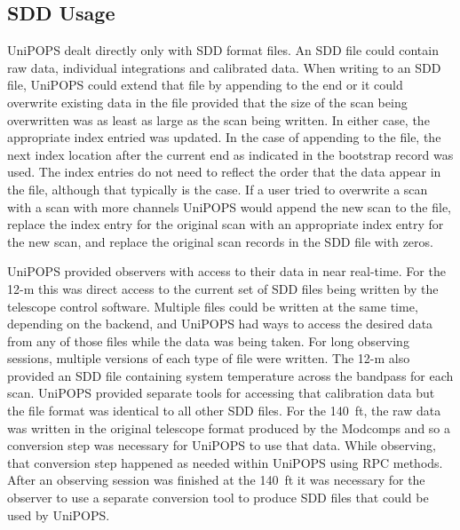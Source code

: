 \documentclass[final,authoryear,5p,times,twocolumn]{elsarticle}
\begin{document}
\subsection{SDD Usage}

UniPOPS dealt directly only with SDD format files.  An SDD file could
contain raw data, individual integrations and calibrated data. When
writing to an SDD file, UniPOPS could extend that file by appending to
the end or it could overwrite existing data in the file provided that
the size of the scan being overwritten was as least as large as the
scan being written.  In either case, the appropriate index entried was
updated.  In the case of appending to the file, the next index
location after the current end as indicated in the bootstrap record
was used.  The index entries do not need to reflect the order that the
data appear in the file, although that typically is the case.  If a
user tried to overwrite a scan with a scan with more channels UniPOPS
would append the new scan to the file, replace the index entry for the
original scan with an appropriate index entry for the new scan, and
replace the original scan records in the SDD file with zeros.

UniPOPS provided observers with access to their data in near
real-time.  For the 12-m this was direct access to the current set of
SDD files being written by the telescope control software.  Multiple
files could be written at the same time, depending on the backend, and
UniPOPS had ways to access the desired data from any of those files
while the data was being taken.  For long observing sessions, multiple
versions of each type of file were written. The 12-m also provided an
SDD file containing system temperature across the bandpass for each
scan.  UniPOPS provided separate tools for accessing that calibration
data but the file format was identical to all other SDD files.  For
the 140\, ft, the raw data was written in the original telescope
format produced by the Modcomps and so a conversion step was necessary
for UniPOPS to use that data.  While observing, that conversion step
happened as needed within UniPOPS using RPC methods.  After an
observing session was finished at the 140\, ft it was necessary for
the observer to use a separate conversion tool to produce SDD files
that could be used by UniPOPS.
\end{document}
